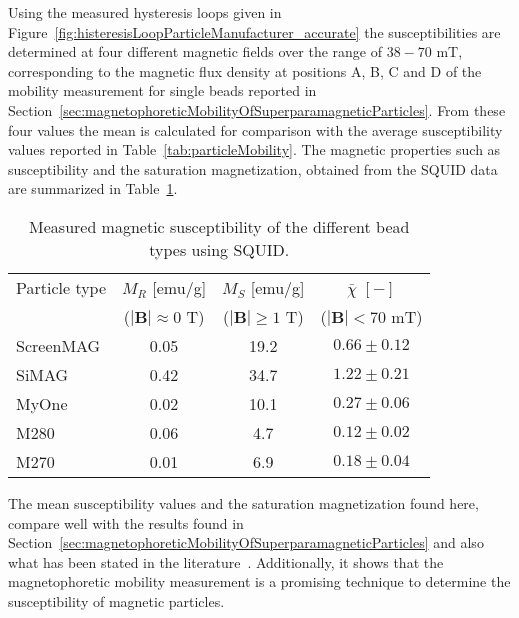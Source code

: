Using the measured hysteresis loops given in Figure~\ref{fig:histeresisLoopParticleManufacturer_accurate} the susceptibilities are determined at four different magnetic fields over the range of $38-70$ mT, corresponding to the magnetic flux density at positions A, B, C and D of the mobility measurement for single beads reported in Section~\ref{sec:magnetophoreticMobilityOfSuperparamagneticParticles}. From these four values the mean is calculated for comparison with the average susceptibility values reported in Table~\ref{tab:particleMobility}. The magnetic properties such as susceptibility and the saturation magnetization, obtained from the SQUID data are summarized in Table~\ref{tab:particleSusceptibility}.
\begin{table}[htb]
\begin{center}
\caption[Experimentally found magnetophoretic mobility and susceptibility of superparamagnetic beads using SQUID]{Measured magnetic susceptibility of the different bead types using SQUID.}
\vspace{1ex}
\label{tab:particleSusceptibility}
\begin{tabular}{lccc}\hline
Particle type  		& $M_{R}$ [emu/g] 				& $M_{S}$ [emu/g]  			& $\bar{\chi}$ $[-]$\\ 
 					& ($|\mathbf{B}|\approx 0$ T)	&($|\mathbf{B}|\geq 1$ T) 	& ($|\mathbf{B}|< 70$ mT)\\ 
\hline
ScreenMAG		& 0.05							& 19.2  					& $0.66 \pm 0.12$ \\
SiMAG		 		& 0.42							& 34.7 					& $1.22 \pm 0.21$ \\
MyOne 				& 0.02							& 10.1  					& $0.27 \pm 0.06$ \\
M280 				& 0.06							& 4.7  					& $0.12 \pm 0.02$ \\
M270 				& 0.01							& 6.9  					& $0.18 \pm 0.04$\\ 
\hline
\end{tabular}
\end{center}
\end{table}

The mean susceptibility values and the saturation magnetization found here, compare well with the results found in Section~\ref{sec:magnetophoreticMobilityOfSuperparamagneticParticles} and also what has been stated in the literature~\cite{Haefeli2005,Wise2015,Fonnum2005,Zborowski2002}. Additionally, it shows that the magnetophoretic mobility measurement is a promising technique to determine the susceptibility of magnetic particles. 

